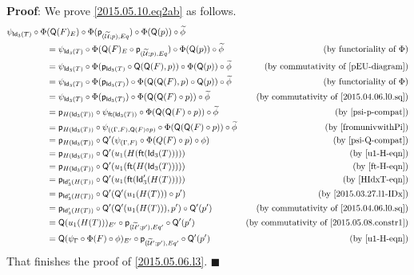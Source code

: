 \documentclass[12pt]{article}
\numberwithin{equation}{section}
\newenvironment{myproof}{{\bf Proof}:}{$\blacksquare$ \vskip 5mm }
\newcommand{\by}[1]{\text{(by #1)}}
\newcommand{\wt}{\widetilde}
\newcommand{\ft}{\mathsf{ft}}
\newcommand{\p}{\mathsf{p}}
\newcommand{\Idx}{\mathsf{Id}_3} %
\newcommand{\U}{\mathcal{U}}
\newcommand{\Q}{\mathsf{Q}}
\begin{document}
\begin{myproof}
We prove \ref{2015.05.10.eq2ab} as follows.
%
\begin{align*}
  \psi_{\Idx(T)}\circ \Phi&(\Q(F)_E)\circ \Phi(\p_{(\wt{\U};p),Eq})\circ \Phi(\Q(p))\circ \wt{\phi} \\
    & = \psi_{\Idx(T)} \circ \Phi(\Q(F)_E \circ \p_{(\wt{\U};p),Eq})\circ \Phi(\Q(p))\circ \wt{\phi}    & \by{functoriality of $\Phi$} \\
    & = \psi_{\Idx(T)} \circ \Phi(\p_{\Idx(T)}\circ \Q(\Q(F),p))\circ \Phi(\Q(p))\circ\wt{\phi}         & \by{commutativity of \ref{pEU-diagram}} \\
    & = \psi_{\Idx(T)} \circ \Phi(\p_{\Idx(T)}) \circ \Phi(\Q(\Q(F),p) \circ \Q(p))\circ \wt\phi        & \by{functoriality of $\Phi$} \\
    & = \psi_{\Idx(T)} \circ \Phi(\p_{\Idx(T)}) \circ \Phi(\Q(\Q(F) \circ p)) \circ \wt\phi             & \by{commutativity of \ref{2015.04.06.l0.sq}} \\
    & = \p_{H(\Idx(T))}\circ \psi_{\ft(\Idx(T))}\circ \Phi(\Q(\Q(F) \circ p)) \circ \wt\phi             & \by{\ref{psi-p-compat}} \\
    & = \p_{H(\Idx(T))}\circ \psi_{((\Gamma,F),\Q(F)\circ p)}\circ\Phi(\Q(\Q(F)\circ p))\circ\wt{\phi}  & \by{\cite[Lemma 3.2]{fromunivwithPi}} \\
    & = \p_{H(\Idx(T))}\circ \Q'(\psi_{(\Gamma,F)} \circ \Phi(Q(F)\circ p) \circ \phi)                  & \by{\ref{psi-Q-compat}} \\
    & = \p_{H(\Idx(T))}\circ \Q'(u_1(H(\ft(\Idx(T)))))                                                  & \by{\ref{u1-H-eqn}} \\
    & = \p_{H(\Idx(T))}\circ \Q'(u_1(\ft(H(\Idx(T)))))                                                  & \by{\ref{ft-H-eqn}} \\
    & = \p_{\Idx'(H(T))}\circ \Q'(u_1(\ft(\Idx'(H(T)))))                                                & \by{\ref{HIdxT-eqn}} \\
    & = \p_{\Idx'(H(T))}\circ \Q'(\Q'(u_1(H(T)))\circ p')                                               & \by{\ref{2015.03.27.l1-IDx}} \\
    & = \p_{\Idx'(H(T))}\circ \Q'(\Q'(u_1(H(T))),p')\circ \Q'(p')                                       & \by{commutativity of \ref{2015.04.06.l0.sq}} \\
    & = \Q(u_1(H(T)))_{E'}\circ \p_{(\wt{\U}';p'),Eq'}\circ \Q'(p')                                     & \by{commutativity of \ref{2015.05.08.constr1}} \\
    & = \Q(\psi_{\Gamma}\circ \Phi(F)\circ \phi)_{E'}\circ \p_{(\wt{\U}';p'),Eq'}\circ \Q'(p')          & \by{\ref{u1-H-eqn}} 
\end{align*}
That finishes the proof of \ref{2015.05.06.l3}.
\end{myproof}
\end{document}
